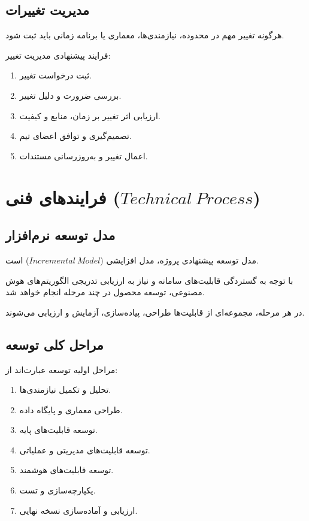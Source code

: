 \documentclass[12pt,a4paper]{article}
\begin{document}
	\subsection{مدیریت تغییرات}
	
	هرگونه تغییر مهم در محدوده، نیازمندی‌ها،
	معماری یا برنامه زمانی باید ثبت شود.
	
	فرایند پیشنهادی مدیریت تغییر:
	
	\begin{enumerate}
		\item ثبت درخواست تغییر.
		\item بررسی ضرورت و دلیل تغییر.
		\item ارزیابی اثر تغییر بر زمان، منابع و کیفیت.
		\item تصمیم‌گیری و توافق اعضای تیم.
		\item اعمال تغییر و به‌روزرسانی مستندات.
	\end{enumerate}
	
	
	\section{فرایندهای فنی ($Technical\ Process$)}
	
	\subsection{مدل توسعه نرم‌افزار}
	
	مدل توسعه پیشنهادی پروژه،
	مدل افزایشی ($Incremental\ Model$) است.
	
	با توجه به گستردگی قابلیت‌های سامانه
	و نیاز به ارزیابی تدریجی الگوریتم‌های هوش مصنوعی،
	توسعه محصول در چند مرحله انجام خواهد شد.
	
	در هر مرحله، مجموعه‌ای از قابلیت‌ها
	طراحی، پیاده‌سازی، آزمایش و ارزیابی می‌شوند.
	
	\subsection{مراحل کلی توسعه}
	
	مراحل اولیه توسعه عبارت‌اند از:
	
	\begin{enumerate}
		\item تحلیل و تکمیل نیازمندی‌ها.
		\item طراحی معماری و پایگاه داده.
		\item توسعه قابلیت‌های پایه.
		\item توسعه قابلیت‌های مدیریتی و عملیاتی.
		\item توسعه قابلیت‌های هوشمند.
		\item یکپارچه‌سازی و تست.
		\item ارزیابی و آماده‌سازی نسخه نهایی.
	\end{enumerate}
	
\end{document}
